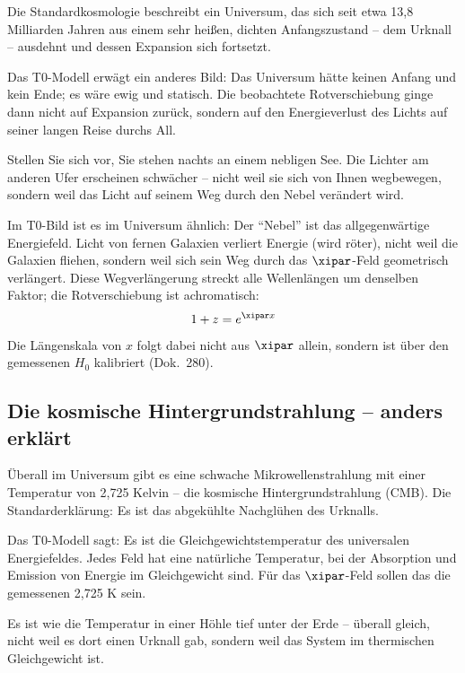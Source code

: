 	Die Standardkosmologie beschreibt ein Universum, das sich seit etwa 13,8 Milliarden Jahren aus einem sehr heißen, dichten Anfangszustand -- dem Urknall -- ausdehnt und dessen Expansion sich fortsetzt.

	Das T0-Modell erwägt ein anderes Bild: Das Universum hätte keinen Anfang und kein Ende; es wäre ewig und statisch. Die beobachtete Rotverschiebung ginge dann nicht auf Expansion zurück, sondern auf den Energieverlust des Lichts auf seiner langen Reise durchs All.
	
	\begin{revolutionary}
		Stellen Sie sich vor, Sie stehen nachts an einem nebligen See. Die Lichter am anderen Ufer erscheinen schwächer -- nicht weil sie sich von Ihnen wegbewegen, sondern weil das Licht auf seinem Weg durch den Nebel verändert wird.

		Im T0-Bild ist es im Universum ähnlich: Der ``Nebel'' ist das allgegenwärtige Energiefeld. Licht von fernen Galaxien verliert Energie (wird röter), nicht weil die Galaxien fliehen, sondern weil sich sein Weg durch das $\xipar$-Feld geometrisch verlängert. Diese Wegverlängerung streckt alle Wellenlängen um denselben Faktor; die Rotverschiebung ist achromatisch:
		\begin{equation}
			1 + z = e^{\xipar x}
		\end{equation}
		Die Längenskala von $x$ folgt dabei nicht aus $\xipar$ allein, sondern ist über den gemessenen $H_0$ kalibriert (Dok.~280).
	\end{revolutionary}


	\subsection{Die kosmische Hintergrundstrahlung -- anders erklärt}
	
	Überall im Universum gibt es eine schwache Mikrowellenstrahlung mit einer Temperatur von 2,725 Kelvin -- die kosmische Hintergrundstrahlung (CMB). Die Standarderklärung: Es ist das abgekühlte Nachglühen des Urknalls.
	
	Das T0-Modell sagt: Es ist die Gleichgewichtstemperatur des universalen Energiefeldes. Jedes Feld hat eine natürliche Temperatur, bei der Absorption und Emission von Energie im Gleichgewicht sind. Für das $\xipar$-Feld sollen das die gemessenen 2,725 K sein.
	
	Es ist wie die Temperatur in einer Höhle tief unter der Erde -- überall gleich, nicht weil es dort einen Urknall gab, sondern weil das System im thermischen Gleichgewicht ist.
	
